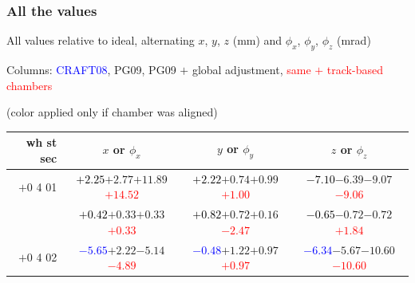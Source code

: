 \documentclass[compress]{beamer}
\begin{document}
\begin{frame}
\frametitle{All the values}
\tiny

All values relative to ideal, alternating $x$, $y$, $z$ (mm) and $\phi_x$, $\phi_y$, $\phi_z$ (mrad)

Columns: \textcolor{blue}{CRAFT08}, PG09, PG09 $+$ global adjustment, \textcolor{red}{same $+$ track-based chambers}

\hfill (color applied only if chamber was aligned)

\vfill
\renewcommand{\arraystretch}{1.1}
\begin{tabular}{r | c | c | c}
wh st sec & $x$ or $\phi_x$ & $y$ or $\phi_y$ & $z$ or $\phi_z$ \\\hline
$+$0 4 01 & \textcolor{black}{$+2.25$}\hspace{0.1 cm}$+2.77$\hspace{0.1 cm}$+11.89$\hspace{0.1 cm}\textcolor{red}{$+14.52$} & \textcolor{black}{$+2.22$}\hspace{0.1 cm}$+0.74$\hspace{0.1 cm}$+0.99$\hspace{0.1 cm}\textcolor{red}{$+1.00$} & \textcolor{black}{$-7.10$}\hspace{0.1 cm}$-6.39$\hspace{0.1 cm}$-9.07$\hspace{0.1 cm}\textcolor{red}{$-9.06$} \\
          & \textcolor{black}{$+0.42$}\hspace{0.1 cm}$+0.33$\hspace{0.1 cm}$+0.33$\hspace{0.1 cm}\textcolor{red}{$+0.33$} & \textcolor{black}{$+0.82$}\hspace{0.1 cm}$+0.72$\hspace{0.1 cm}$+0.16$\hspace{0.1 cm}\textcolor{red}{$-2.47$} & \textcolor{black}{$-0.65$}\hspace{0.1 cm}$-0.72$\hspace{0.1 cm}$-0.72$\hspace{0.1 cm}\textcolor{red}{$+1.84$} \\
$+$0 4 02 & \textcolor{blue}{$-5.65$}\hspace{0.1 cm}$+2.22$\hspace{0.1 cm}$-5.14$\hspace{0.1 cm}\textcolor{red}{$-4.89$} & \textcolor{blue}{$-0.48$}\hspace{0.1 cm}$+1.22$\hspace{0.1 cm}$+0.97$\hspace{0.1 cm}\textcolor{red}{$+0.97$} & \textcolor{blue}{$-6.34$}\hspace{0.1 cm}$-5.67$\hspace{0.1 cm}$-10.60$\hspace{0.1 cm}\textcolor{red}{$-10.60$} \\

\end{tabular}
\end{frame}
\end{document}
